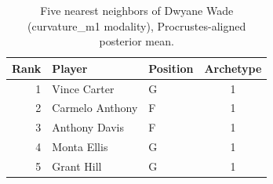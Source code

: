 \begin{table}[htbp]
  \centering\small
  \begin{tabular}{rllc}
    \toprule
    Rank & Player & Position & Archetype \\
    \midrule
    1 & Vince Carter & G & 1 \\
    2 & Carmelo Anthony & F & 1 \\
    3 & Anthony Davis & F & 1 \\
    4 & Monta Ellis & G & 1 \\
    5 & Grant Hill & G & 1 \\
    \bottomrule
  \end{tabular}
  \caption{Five nearest neighbors of Dwyane Wade (curvature_m1 modality), Procrustes-aligned posterior mean.}
  \label{tab:Dwyane_Wade_neighbors_curvature_m1}
\end{table}

